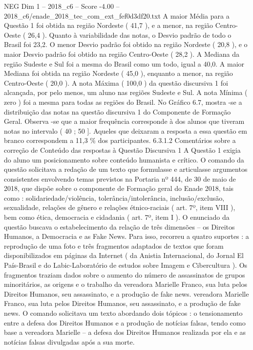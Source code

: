 \begin{textsample}{NEG Dim 1 – 2018\_c6 – Score -4.00 – 2018\_c6/enade\_2018\_tec\_com\_ext\_fef0d3df20.txt}
A maior Média para a Questão 1 foi obtida na região Nordeste ( 41,7 ), e a menor, na região Centro-Oeste ( 26,4 ).
Quanto à variabilidade das notas, o Desvio padrão de todo o Brasil foi 23,2.
O menor Desvio padrão foi obtido na região Nordeste ( 20,8 ), e o maior Desvio padrão foi obtido na região Centro-Oeste ( 28,2 ).
A Mediana da região Sudeste e Sul foi a mesma do Brasil como um todo, igual a 40,0.
A maior Mediana foi obtida na região Nordeste ( 45,0 ), enquanto a menor, na região Centro-Oeste ( 20,0 ).
A nota Máxima ( 100,0 ) da questão discursiva 1 foi alcançada, por pelo menos, um aluno nas regiões Sudeste e Sul.
A nota Mínima ( zero ) foi a mesma para todas as regiões do Brasil.
No Gráfico 6.7, mostra -se a distribuição das notas na questão discursiva 1 do Componente de Formação Geral.
Observa -se que a maior frequência corresponde à dos alunos que tiveram notas no intervalo ( 40 ; 50 ].
Aqueles que deixaram a resposta a essa questão em branco correspondem a 11,3 \% dos participantes. 6.3.1.2 Comentários sobre a correção de Conteúdo das respostas à Questão Discursiva 1 A Questão 1 exigia do aluno um posicionamento sobre conteúdo humanista e crítico.
O comando da questão solicitava a redação de um texto que formulasse e articulasse argumentos consistentes envolvendo temas previstos na Portaria nº 444, de 30 de maio de 2018, que dispõe sobre o componente de Formação geral do Enade 2018, tais como : solidariedade/violência, tolerância/intolerância, inclusão/exclusão, sexualidade, relações de gênero e relações étnico-raciais ( art. 7º, item VIII ), bem como ética, democracia e cidadania ( art. 7º, item I ).
O enunciado da questão buscava o estabelecimento da relação de três dimensões – os Direitos Humanos, a Democracia e as Fake News.
Para isso, recorreu a quatro suportes : a reprodução de uma foto e três fragmentos adaptados de textos que foram disponibilizados em páginas da Internet ( da Anistia Internacional, do Jornal El País-Brasil e do Labic-Laboratório de estudos sobre Imagem e Cibercultura ).
Os fragmentos traziam dados sobre o aumento do número de assassinatos de grupos minoritários, as origens e o trabalho da vereadora Marielle Franco, sua luta pelos Direitos Humanos, seu assassinato, e a produção de fake news. vereadora Marielle Franco, sua luta pelos Direitos Humanos, seu assassinato, e a produção de fake news.
O comando solicitava um texto abordando dois tópicos : o tensionamento entre a defesa dos Direitos Humanos e a produção de notícias falsas, tendo como base a vereadora Marielle – a defesa dos Direitos Humanos realizada por ela e as notícias falsas divulgadas após a sua morte.

\end{textsample}
